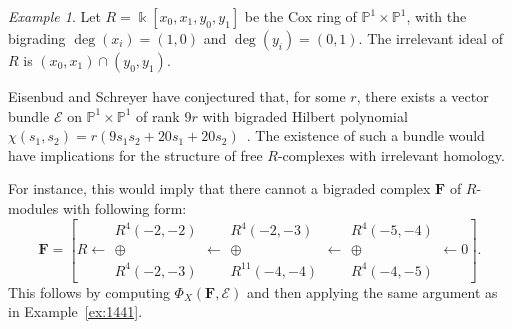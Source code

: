 \documentclass[12pt]{amsart}
\theoremstyle{definition}
\theoremstyle{remark}
\newtheorem{example}[lemma]{Example}
\newcommand{\kk}{\Bbbk}
\newcommand{\PP}{\mathbb{P}}
\newcommand{\cE}{\mathcal{E}}
\newcommand{\FF}{\mathbf{F}}
\begin{document}
\begin{example}
Let $R=\kk[x_0,x_1,y_0,y_1]$ be the Cox ring of $\PP^1\times \PP^1$, with the bigrading $\deg(x_i)=(1,0)$ and $\deg(y_i)=(0,1)$.  The irrelevant ideal of $R$ is $(x_0,x_1)\cap (y_0,y_1)$.  

Eisenbud and Schreyer have conjectured that, for some $r$, there exists a vector bundle $\cE$ on $\PP^1\times \PP^1$ of rank $9r$ with bigraded Hilbert polynomial $\chi(s_1,s_2)=r(9s_1s_2+20s_1+20s_2)$~\cite[Conjecture 2]{eis-schrey-abel}.  The existence of such a bundle would have implications for the structure of free $R$-complexes with irrelevant homology.  

For instance, this would imply that there cannot a bigraded complex $\FF$ of $R$-modules with following form:
\[
\FF
=\left[
R\gets 
\begin{matrix}
R^4(-2,-2)
\\
\oplus
\\
R^4(-2,-3)
\end{matrix}
\gets
\begin{matrix}
R^4(-2,-3)
\\
\oplus
\\
R^{11}(-4,-4)
\end{matrix}
\gets
\begin{matrix}
R^4(-5,-4)
\\
\oplus
\\
R^4(-4,-5)
\end{matrix}
\gets
0
\right].
\]
This follows by computing $\Phi_X(\FF, \cE)$ and then applying the same argument as in Example~\ref{ex:1441}.
\end{example}
\end{document}
